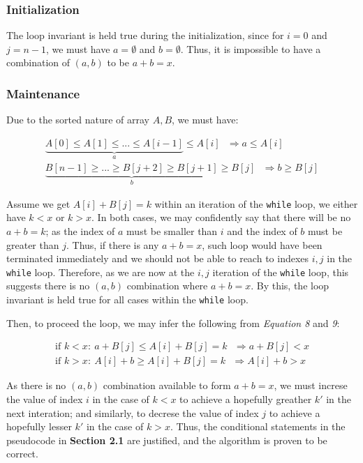 \documentclass[12pt]{article}
\newcommand{\inlinecode}{\texttt}
\begin{document}
\subsubsection{Initialization}
The loop invariant is held true during the initialization, since for $i = 0$ and $j = n-1$, we must have $a = \emptyset$ and $b = \emptyset$. Thus, it is impossible to have a combination of $(a, b)$ to be $a + b = x$.

\subsubsection{Maintenance}

Due to the sorted nature of array $A, B$, we must have:

\begin{gather}
    \underbrace{A[0] \leq A[1] \leq ... \leq A[i-1]}_{a} \leq A[i]  \ \ \ \Rightarrow a \leq A[i]\\
    \underbrace{B[n-1] \geq ... \geq B[j+2] \geq B[j+1]}_{b} \geq B[j] \ \ \ \Rightarrow b \geq B[j]
\end{gather}

Assume we get $A[i] + B[j] = k$ within an iteration of the \inlinecode{while} loop, we either have $k < x$ or $k > x$. In both cases, we may confidently say that there will be no $a + b = k$; as the index of $a$ must be smaller than $i$ and the index of $b$ must be greater than $j$. Thus, if there is any $a + b = x$, such loop would have been terminated immediately and we should not be able to reach to indexes $i, j$ in the \inlinecode{while} loop. Therefore, as we are now at the $i, j$ iteration of the \inlinecode{while} loop, this suggests there is no $(a, b)$ combination where $a + b = x$. By this, the loop invariant is held true for all cases within the \inlinecode{while} loop.\newline

Then, to proceed the loop, we may infer the following from \textit{Equation 8} and \textit{9}:

\begin{gather}
    \text{if } k < x: \ a + B[j] \leq A[i] + B[j] = k  \ \ \ \Rightarrow a + B[j] < x\\
    \text{if } k > x: \ A[i] + b \geq A[i] + B[j] = k  \ \ \ \Rightarrow A[i] + b > x
\end{gather}

As there is no $(a, b)$ combination available to form $a+b = x$, we must increse the value of index $i$ in the case of $k < x$ to achieve a hopefully greather $k'$ in the next interation; and similarly, to decrese the value of index $j$ to achieve a hopefully lesser $k'$ in the case of $k > x$. Thus, the conditional statements in the pseudocode in \textbf{Section 2.1} are justified, and the algorithm is proven to be correct.
\end{document}
